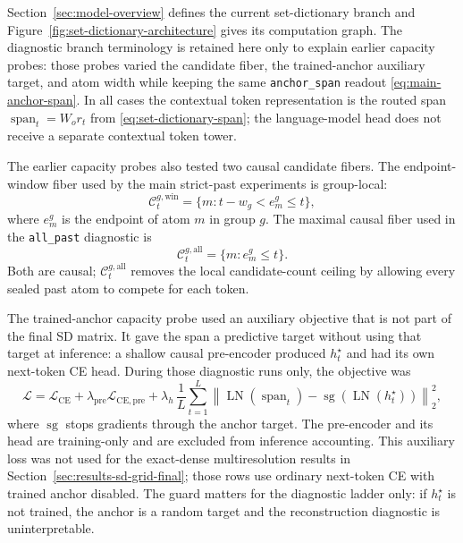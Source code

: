 \documentclass{article}
\theoremstyle{plain}
\theoremstyle{definition}
\theoremstyle{remark}
\begin{document}
Section~\ref{sec:model-overview} defines the current set-dictionary branch and
Figure~\ref{fig:set-dictionary-architecture} gives its computation graph.  The
diagnostic branch terminology is retained here only to explain earlier capacity
probes: those probes varied the candidate fiber, the trained-anchor auxiliary
target, and atom width while keeping the same \texttt{anchor\_span} readout
\eqref{eq:main-anchor-span}.  In all cases the contextual token representation
is the routed span $\operatorname{span}_t=W_o r_t$ from
\eqref{eq:set-dictionary-span}; the language-model head does not receive a
separate contextual token tower.

The earlier capacity probes also tested two causal candidate fibers.  The
endpoint-window fiber used by the main strict-past experiments is group-local:
\begin{equation}
\mathcal C_t^{g,\mathrm{win}}=\{m:t-w_g<e_m^g\le t\},
\end{equation}
where $e_m^g$ is the endpoint of atom $m$ in group $g$.  The maximal causal
fiber used in the \texttt{all\_past} diagnostic is
\begin{equation}
\mathcal C_t^{g,\mathrm{all}}=\{m:e_m^g\le t\}.
\end{equation}
Both are causal; \(\mathcal C_t^{g,\mathrm{all}}\) removes the local
candidate-count ceiling by allowing every sealed past atom to compete for each
token.

The trained-anchor capacity probe used an auxiliary objective that is not part
of the final SD matrix.  It gave the span a predictive target without using
that target at inference: a shallow causal pre-encoder produced $h_t^\star$ and
had its own next-token CE head.  During those diagnostic runs only, the
objective was
\begin{equation}
\label{eq:set-dictionary-anchor-loss}
\mathcal L
=\mathcal L_{\mathrm{CE}}
+\lambda_{\mathrm{pre}}\mathcal L_{\mathrm{CE,pre}}
+\lambda_h\,\frac1L\sum_{t=1}^L
\left\|\operatorname{LN}(\operatorname{span}_t)
-\operatorname{sg}\!\left(\operatorname{LN}(h_t^\star)\right)\right\|_2^2,
\end{equation}
where $\operatorname{sg}$ stops gradients through the anchor target.  The
pre-encoder and its head are training-only and are excluded from inference
accounting.  This auxiliary loss was not used for the exact-dense
multiresolution results in Section~\ref{sec:results-sd-grid-final}; those rows
use ordinary next-token CE with trained anchor disabled.  The guard matters for
the diagnostic ladder only: if $h_t^\star$ is not trained, the anchor is a
random target and the reconstruction diagnostic is uninterpretable.
\end{document}
